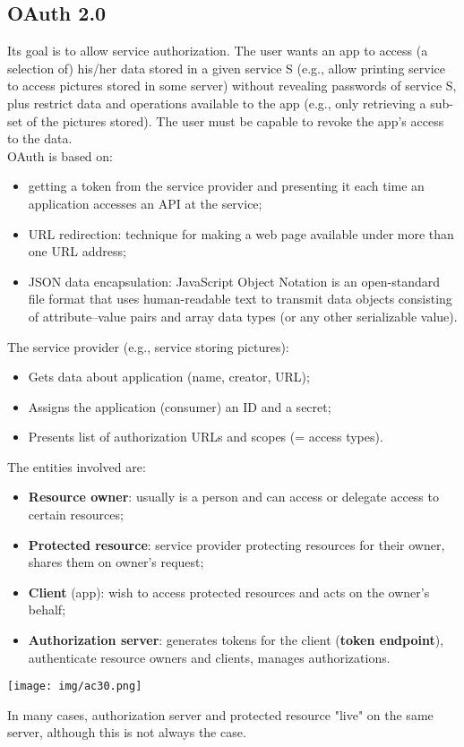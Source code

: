 \documentclass[a4paper, 10pt, titlepage]{article}
\begin{document}
\subsection{OAuth 2.0}
Its goal is to allow service authorization.
The user wants an app to access (a selection of) his/her data stored in a given service S (e.g., allow printing service to access pictures stored in some server) without revealing passwords of service S, plus restrict data and operations available to the app (e.g., only retrieving a sub-set of the pictures stored). The user must be capable to revoke the app's access to the data. \medskip\\
OAuth is based on:
\begin{itemize}
\item getting a token from the service provider and presenting it each time an application accesses an API at the service;
\item URL redirection: technique for making a web page available under more than one URL address;
\item JSON data encapsulation: JavaScript Object Notation is an open-standard file format that uses human-readable text to transmit data objects consisting of attribute–value pairs and array data types (or any other serializable value).
\end{itemize}
The service provider (e.g., service storing pictures):
\begin{itemize}
\item Gets data about application (name, creator, URL);
\item Assigns the application (consumer) an ID and a secret;
\item Presents list of authorization URLs and scopes (= access types).
\end{itemize}
The entities involved are:
\begin{itemize}
\item \textbf{Resource owner}: usually is a person and can access or delegate access to certain resources; 
\item \textbf{Protected resource}: service provider protecting resources for their owner, shares them on owner’s request;
\item \textbf{Client} (app): wish to access protected resources and acts on the owner's behalf;
\item \textbf{Authorization server}: generates tokens for the client (\textbf{token endpoint}), authenticate resource owners and clients, manages authorizations.
\end{itemize}
\begin{center}
\texttt{[image: img/ac30.png]}
\end{center}
In many cases, authorization server and protected resource "live" on the same server, although this is not always the case.
\end{document}

